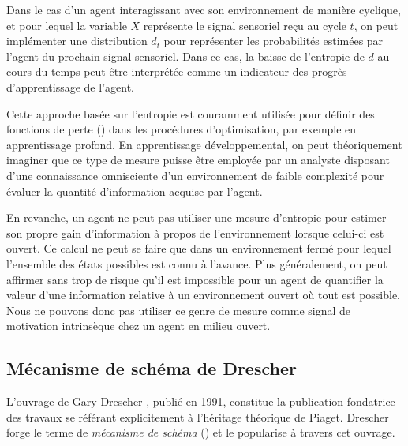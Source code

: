 Dans le cas d'un agent interagissant avec son environnement de manière cyclique, et pour lequel la variable $X$ représente le signal sensoriel reçu au cycle $t$, on peut implémenter une distribution $d_t$ pour représenter les probabilités estimées par l'agent du prochain signal sensoriel. 
Dans ce cas, la baisse de l'entropie de $d$ au cours du temps peut être interprétée comme un indicateur des progrès d'apprentissage de l'agent. 

Cette approche basée sur l'entropie est couramment utilisée pour définir des fonctions de perte () dans les procédures d'optimisation, par exemple en apprentissage profond.
En apprentissage développemental, on peut théoriquement imaginer que ce type de mesure puisse être employée par un analyste disposant d'une connaissance omnisciente d'un environnement de faible complexité pour évaluer la quantité d'information acquise par l'agent. 

En revanche, un agent ne peut pas utiliser une mesure d'entropie pour estimer son propre gain d'information à propos de l'environnement lorsque celui-ci est ouvert.
Ce calcul ne peut se faire que dans un environnement fermé pour lequel l'ensemble des états possibles est connu à l'avance. 
Plus généralement, on peut affirmer sans trop de risque qu'il est impossible pour un agent de quantifier la valeur d'une information relative à un environnement ouvert où tout est possible. 
Nous ne pouvons donc pas utiliser ce genre de mesure comme signal de motivation intrinsèque chez un agent en milieu ouvert.


\subsection{Mécanisme de schéma de Drescher}
\label{sec:drescher}

\noindent
L'ouvrage de Gary Drescher  \cite{drescher_made-up_1991}, publié en 1991, constitue la publication fondatrice des travaux se référant explicitement à l'héritage théorique de Piaget. 
Drescher forge le terme de \emph{mécanisme de schéma} () et le popularise à travers cet ouvrage.


